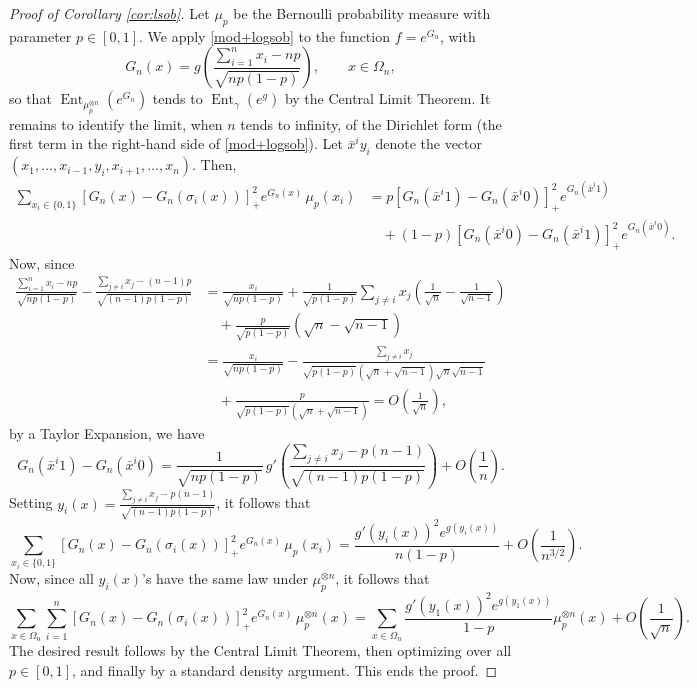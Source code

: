 \documentclass[11pt]{amsart}
\numberwithin{equation}{section}
\begin{document}
\begin{proof}[Proof of Corollary \ref{cor:lsob}]
Let $\mu_p$ be the  Bernoulli probability measure with parameter $p\in [0,1]$. We apply \eqref{mod+logsob} to the function $f=e^{G_n}$, with 
$$
G_n(x)={ g \left( \frac{\sum_{i=1}^n x_i - np}{\sqrt{ np(1-p)}} \right)}, \qquad  x \in \Omega_n,
$$ 
so that ${\operatorname{Ent}}_{\mu_p^{\otimes n}}\left(e^{G_n}\right)$ tends to ${\operatorname{Ent}}_\gamma(e^g)$ by the Central Limit Theorem.
It remains to identify the limit, when $n$ tends to infinity, of the Dirichlet form (the first term in the right-hand side of \eqref{mod+logsob}). 
Let $\bar{x}^iy_i$ denote the vector $(x_1,\ldots,x_{i-1},y_i,x_{i+1},\ldots,x_{n})$.
Then,
 \begin{align*}
\sum_{x_i\in \{0,1\}} [G_n(x)-G_n(\sigma_i(x))]_+^2 e^{G_n(x)}\,\mu_p(x_i)&=p [G_n(\bar{x}^i1)-G_n(\bar{x}^i0)]_+^2 e^{G_n(\bar{x}^i1)}\\ &\quad
+ (1-p) [G_n(\bar{x}^i0)-G_n(\bar{x}^i1)]_+^2 e^{G_n(\bar{x}^i0)} .
\end{align*}
Now, since
\begin{align*}
\frac{\sum_{i=1}^n x_i - np}{\sqrt{ np(1-p)}} -  \frac{\sum_{j\neq i} x_j- (n-1)p}{\sqrt {(n-1)p(1-p)}}
&=\frac{x_i}{\sqrt{ np(1-p)}}+\frac 1{\sqrt{ p(1-p)}}\sum_{j\neq i} x_j\left(\frac 1{\sqrt{n}}-\frac 1{\sqrt{n-1}}\right) \\
& \quad +\frac p{\sqrt{ p(1-p)}}\left(\sqrt n-\sqrt{n-1}\right)\\
&=\frac{x_i}{\sqrt{ np(1-p)}}-\frac{\sum_{j\neq i} x_j}{ \sqrt{ p(1-p)}  \left({\sqrt{n}}+{\sqrt{n-1}}\right){\sqrt{n}}{\sqrt{n-1}}} \\
& \quad +\frac p{\sqrt{ p(1-p)}\left(\sqrt n+\sqrt{n-1}\right)}
=O\left(\frac1{\sqrt {n}}\right) ,
\end{align*}
 by a Taylor Expansion, we have
$$
G_n(\bar{x}^i1)-G_n(\bar{x}^i0)=\frac1{\sqrt{ np(1-p)}}\,g'\left(\frac{\sum_{j\neq i} x_j-p ({n-1})}{\sqrt {(n-1)p(1-p)}}\right)+O\left(\frac 1n \right).
$$
Setting $\displaystyle y_i(x)=\frac{\sum_{j\neq i} x_j-p( {n-1})}{\sqrt {(n-1)p(1-p)}}$, it  follows that 
$$
\sum_{x_i\in \{0,1\}}[G_n(x)-G_n(\sigma_i(x))]_+^2 e^{G_n(x)}\,\mu_p(x_i)
=
\frac { g'\left(y_i(x)\right)^2 e^{g(y_i(x))}}{n(1-p)}  + O\left(\frac1{n^{3/2}}\right).
$$
Now, since all $y_i(x)$'s have the same law under $\mu_p^{\otimes n}$, it follows that 
$$
 \sum_{x\in \Omega_n} \sum_{i=1}^n[G_n(x)-G_n(\sigma_i(x))]_+^2 e^{G_n(x)}\,\mu_p^{\otimes n}(x)
  =  \!\! \sum_{x\in \Omega_n} \! \frac{g'\left(y_1(x) \right)^2e^{g(y_1(x))}}{1-p} \mu_p^{ \otimes n}(x)  +O\left(\frac1{\sqrt {n}}\right).
$$
The desired result follows by the Central Limit Theorem, then optimizing over all $p\in [0,1]$, and finally by a standard density argument. This ends the proof.
\end{proof}
\end{document}
